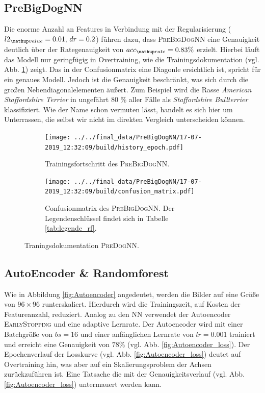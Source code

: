 \subsection{PreBigDogNN}
Die enorme Anzahl an Features in Verbindung mit der Regularisierung ($l2\ua{value}=0.01, \, dr=0.2$)
führen dazu, dass \textsc{PreBigDogNN} eine Genauigkeit deutlich über der Rategenauigkeit
von $acc\ua{rate}=0.83\%$ erzielt. Hierbei läuft das Modell nur geringfügig in Overtraining,
wie die Trainingsdokumentation (vgl. Abb. \ref{fig:PreBigDogNN_Loss_Acc}) zeigt.
Das in der Confusionmatrix eine Diagonle ersichtlich ist, spricht für ein genaues Modell.
Jedoch ist die Genauigkeit beschränkt, was sich durch die großen Nebendiagonalelementen
äußert. Zum Beispiel wird die Rasse \emph{American Staffordshire Terrier}
in ungefährt 80 \% aller Fälle als \emph{Staffordshire Bullterrier} klassifiziert.
Wie der Name schon vermuten lässt, handelt es sich hier um Unterrassen, die
selbst wir nicht im direkten Vergleich unterscheiden können.
\begin{figure}
\centering
\begin{subfigure}{0.48\textwidth}
\centering
\texttt{[image: ../../final\_data/PreBigDogNN/17-07-2019\_12:32:09/build/history\_epoch.pdf]}
\caption{Trainingsfortschritt des \textsc{PreBigDogNN}.}
\label{fig:PreBigDogNN_Loss_Acc}
\end{subfigure}
\begin{subfigure}{0.48\textwidth}
\centering
\texttt{[image: ../../final\_data/PreBigDogNN/17-07-2019\_12:32:09/build/confusion\_matrix.pdf]}
\caption{Confusionmatrix des \textsc{PreBigDogNN}. Der Legendenschlüssel findet sich in
Tabelle \ref{tab:legende_rf}.}
\label{fig:PreBigDogNN_Confusionmatrix}
\end{subfigure}
\caption{Traningsdokumentation \textsc{PreDogNN}.}
\end{figure}
\subsection{AutoEncoder \& Randomforest}
Wie in Abbildung \ref{fig:Autoencoder} angedeutet, werden die Bilder auf eine Größe von $96\times96$ runterskaliert.
Hierdurch wird die Trainingszeit, auf Kosten der Featureanzahl,
reduziert. Analog zu den NN verwendet der Autoencoder \textsc{EarlyStopping}
und eine adaptive Lernrate. Der Autoencoder wird mit einer Batchgröße
von $bs=16$ und einer anfänglichen Lernrate von $lr=0.001$ trainiert und
erreicht eine Genauigkeit von $78\%$ (vgl. Abb. \ref{fig:Autoencoder_loss}).
Der Epochenverlauf der Losskurve (vgl. Abb. \ref{fig:Autoencoder_loss}) deutet auf Overtraining hin, was aber auf ein Skalierungsproblem der Achsen zurückzuführen ist.
Eine Tatsache die mit der Genauigkeitsverlauf (vgl. Abb. \ref{fig:Autoencoder_loss}) untermauert werden kann.

